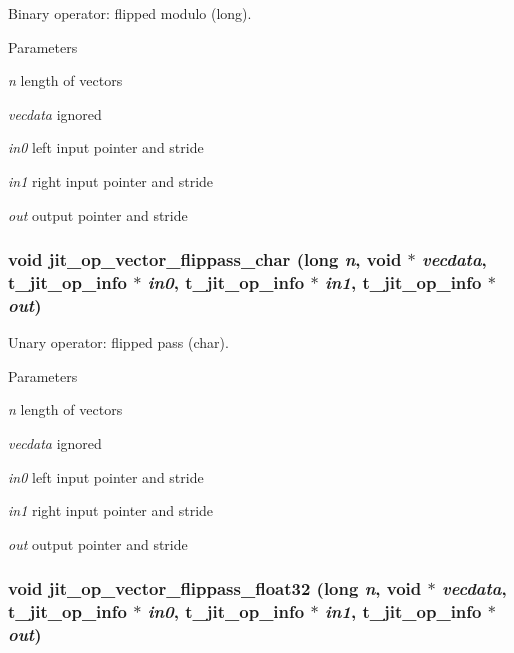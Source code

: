 Binary operator: flipped modulo (long). 
\begin{DoxyParams}{Parameters}
\item[{\em n}]length of vectors \item[{\em vecdata}]ignored \item[{\em in0}]left input pointer and stride \item[{\em in1}]right input pointer and stride \item[{\em out}]output pointer and stride \end{DoxyParams}
\hypertarget{group__opvecmod_gaec7aba578dcdb7c75b76e8857f57dab7}{
\subsubsection[{jit\_\-op\_\-vector\_\-flippass\_\-char}]{\setlength{\rightskip}{0pt plus 5cm}void jit\_\-op\_\-vector\_\-flippass\_\-char (long {\em n}, \/  void $\ast$ {\em vecdata}, \/  {\bf t\_\-jit\_\-op\_\-info} $\ast$ {\em in0}, \/  {\bf t\_\-jit\_\-op\_\-info} $\ast$ {\em in1}, \/  {\bf t\_\-jit\_\-op\_\-info} $\ast$ {\em out})}}
\label{group__opvecmod_gaec7aba578dcdb7c75b76e8857f57dab7}


Unary operator: flipped pass (char). 
\begin{DoxyParams}{Parameters}
\item[{\em n}]length of vectors \item[{\em vecdata}]ignored \item[{\em in0}]left input pointer and stride \item[{\em in1}]right input pointer and stride \item[{\em out}]output pointer and stride \end{DoxyParams}
\hypertarget{group__opvecmod_ga80ad91dae3359d0e7160afb855811b50}{
\subsubsection[{jit\_\-op\_\-vector\_\-flippass\_\-float32}]{\setlength{\rightskip}{0pt plus 5cm}void jit\_\-op\_\-vector\_\-flippass\_\-float32 (long {\em n}, \/  void $\ast$ {\em vecdata}, \/  {\bf t\_\-jit\_\-op\_\-info} $\ast$ {\em in0}, \/  {\bf t\_\-jit\_\-op\_\-info} $\ast$ {\em in1}, \/  {\bf t\_\-jit\_\-op\_\-info} $\ast$ {\em out})}}
\label{group__opvecmod_ga80ad91dae3359d0e7160afb855811b50}


